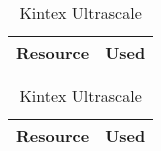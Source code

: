 \begin{table}[H]
\ifnum{}
\begin{minipage}{.45\linewidth}
\centering
\begin{tabular}{|l|r|}
\hline
\rowcolor{iob-green}
\textbf{Resource}  & \textbf{Used} \\
\hline
\hline
 
\end{tabular}
\end{minipage}
\fi
\ifnum{}
\begin{minipage}{.45\linewidth}
\centering
\begin{tabular}{|l|r|}
\hline
\rowcolor{iob-green}
\textbf{Resource}  & \textbf{Used} \\
\hline
\hline
 
\end{tabular}
\end{minipage}
\fi
\ifnum{}
\ifnum{}
\caption{Kintex Ultrascale (left) and Cyclone V GT (right)}
\fi
\ifnum{}
\caption{Cyclone V GT}
\fi
\fi
\ifnum{}
\ifnum{}
\caption{Kintex Ultrascale}
\fi
\fi
\end{table}

